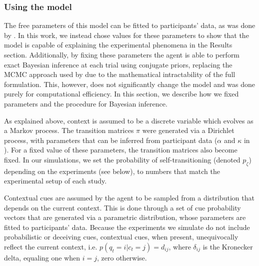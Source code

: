 \documentclass[a4paper,doc,floatsintext,natbib]{apa6}
\begin{document}
\subsubsection{Using the model}
The free parameters of this model can be fitted to participants' data, as was done by \cite{Heald_Contextual_2021}. In this work, we instead chose values for these parameters to show that the model is capable of explaining the experimental phenomena in the Results section. Additionally, by fixing these parameters the agent is able to perform exact Bayesian inference at each trial using conjugate priors, replacing the MCMC approach used by \cite{Heald_Contextual_2021} due to the mathematical intractability of the full formulation. This, however, does not significantly change the model and was done purely for computational efficiency. In this section, we describe how we fixed parameters and the procedure for Bayesian inference.

As explained above, context is assumed to be a discrete variable which evolves as a Markov process. The transition matrices $\pi$ were generated via a Dirichlet process, with parameters that can be inferred from participant data ($\alpha$ and $\kappa$ in \cite{Heald_Contextual_2021}). For a fixed value of these parameters, the transition matrices also become fixed. In our simulations, we set the probability of self-transitioning (denoted $p_\zeta$) depending on the experiments (see below), to numbers that match the experimental setup of each study.

Contextual cues are assumed by the agent to be sampled from a distribution that depends on the current context. This is done through a set of cue probability vectors that are generated via a parametric distribution, whose parameters are fitted to participants' data. Because the experiments we simulate do not include probabilistic or deceiving cues, contextual cues, when present, unequivocally reflect the current context, i.e. $p(q_t = i | c_t = j) = d_{ij}$, where $\delta_{ij}$ is the Kronecker delta, equaling one when $i = j$, zero otherwise.
\end{document}

